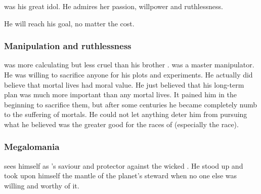 
\TyarithXserasshana{} was his great idol. 
He admires her passion, willpower and ruthlessness. 


He will reach his goal, no matter the cost.






\subsubsection{Manipulation and ruthlessness}
\Secherdamon was more calculating but less cruel than his brother \Iscrafel. 
\Secherdamon was a master manipulator.
He was willing to sacrifice anyone for his plots and experiments. 
He actually did believe that mortal lives had moral value.
He just believed that his long-term plan was much more important than any mortal lives. 
It pained him in the beginning to sacrifice them, but after some centuries he became completely numb to the suffering of mortals. 
He could not let anything deter him from pursuing what he believed was the greater good for the races of \Miith (especially the \draconian race). 




\subsubsection{Megalomania}
\Secherdamon{} sees himself as \Miith{}'s saviour and protector against the wicked \banes. He stood up and took upon himself the mantle of the planet's steward when no one else was willing and worthy of it. 

